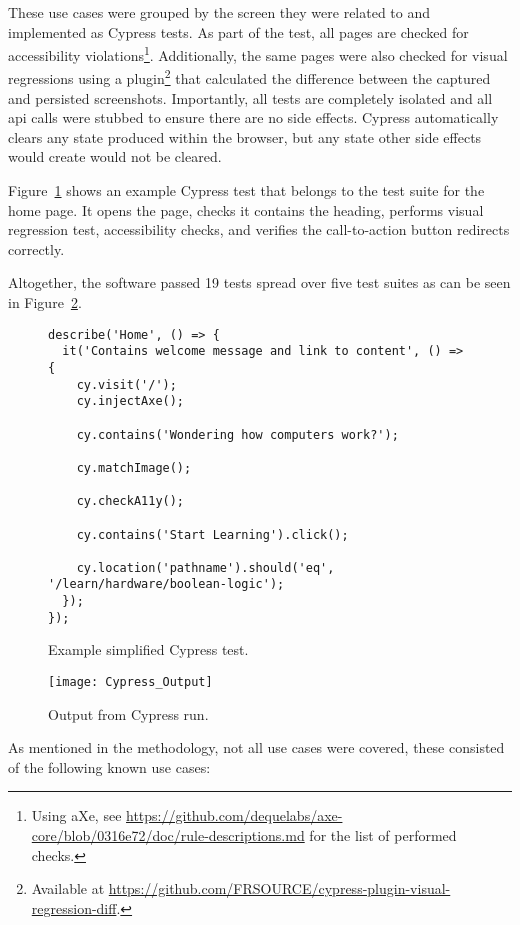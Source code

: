 These use cases were grouped by the screen they were related to and implemented as Cypress tests.
As part of the test, all pages are checked for accessibility violations\footnote{Using aXe, see \url{https://github.com/dequelabs/axe-core/blob/0316e72/doc/rule-descriptions.md} for the list of performed checks.}.
Additionally, the same pages were also checked for visual regressions using a plugin\footnote{Available at \url{https://github.com/FRSOURCE/cypress-plugin-visual-regression-diff}.} that calculated the difference between the captured and persisted screenshots.
Importantly, all tests are completely isolated and all \gls{api} calls were stubbed to ensure there are no side effects.
Cypress automatically clears any state produced within the browser, but any state other side effects would create would not be cleared.

Figure~\ref{fig:test-cypress-example} shows an example Cypress test that belongs to the test suite for the home page.
It opens the page, checks it contains the heading, performs visual regression test, accessibility checks, and verifies the call-to-action button redirects correctly.

Altogether, the software passed 19 tests spread over five test suites as can be seen in Figure~\ref{fig:test-cypress}.

\begin{figure}[H]
\begin{verbatim}
describe('Home', () => {
  it('Contains welcome message and link to content', () => {
    cy.visit('/');
    cy.injectAxe();

    cy.contains('Wondering how computers work?');

    cy.matchImage();

    cy.checkA11y();

    cy.contains('Start Learning').click();

    cy.location('pathname').should('eq', '/learn/hardware/boolean-logic');
  });
});
\end{verbatim}
    \caption{Example simplified Cypress test.}
    \label{fig:test-cypress-example}
\end{figure}

\begin{figure}[H]
    \texttt{[image: Cypress\_Output]}
    \caption{Output from Cypress run.}
    \label{fig:test-cypress}
\end{figure}

As mentioned in the methodology, not all use cases were covered, these consisted of the following known use cases:

